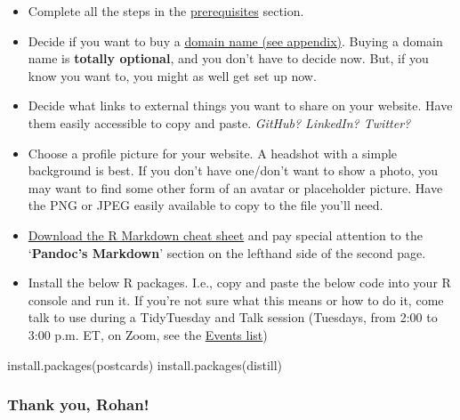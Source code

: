 \documentclass[
]{article}
\newenvironment{Shaded}{\begin{snugshade}}{\end{snugshade}}
\newcommand{\FunctionTok}[1]{\textcolor[rgb]{0.00,0.00,0.00}{#1}}
\newcommand{\NormalTok}[1]{#1}
\newcommand{\StringTok}[1]{\textcolor[rgb]{0.31,0.60,0.02}{#1}}
\begin{document}
\begin{itemize}
\item
  Complete all the steps in the \protect\hyperlink{prereqs}{prerequisites} section.
\item
  Decide if you want to buy a \protect\hyperlink{domain}{domain name (see appendix)}. Buying a domain name is \textbf{totally optional}, and you don't have to decide now. But, if you know you want to, you might as well get set up now.
\item
  Decide what links to external things you want to share on your website. Have them easily accessible to copy and paste. \emph{GitHub? LinkedIn? Twitter?}
\item
  Choose a profile picture for your website. A headshot with a simple background is best. If you don't have one/don't want to show a photo, you may want to find some other form of an avatar or placeholder picture. Have the PNG or JPEG easily available to copy to the file you'll need.
\item
  \href{https://github.com/rstudio/cheatsheets/raw/master/rmarkdown-2.0.pdf}{Download the R Markdown cheat sheet} and pay special attention to the `\textbf{Pandoc's Markdown}' section on the lefthand side of the second page.
\item
  Install the below R packages. I.e., copy and paste the below code into your R console and run it. If you're not sure what this means or how to do it, come talk to use during a TidyTuesday and Talk session (Tuesdays, from 2:00 to 3:00 p.m. ET, on Zoom, see the \href{https://utoronto.sharepoint.com/sites/ArtSci-STA/ISSC/_layouts/15/Events.aspx?ListGuid=0679786c-8a7e-483c-9ec5-3845602a70e5}{Events list})
\end{itemize}

\begin{Shaded}
\begin{Highlighting}[]
\FunctionTok{install.packages}\NormalTok{(}\StringTok{\textquotesingle{}postcards\textquotesingle{}}\NormalTok{)}
\FunctionTok{install.packages}\NormalTok{(}\StringTok{\textquotesingle{}distill\textquotesingle{}}\NormalTok{)}
\end{Highlighting}
\end{Shaded}

\hypertarget{thank-you-rohan}{%
\subsubsection{Thank you, Rohan!}\label{thank-you-rohan}}
\end{document}
